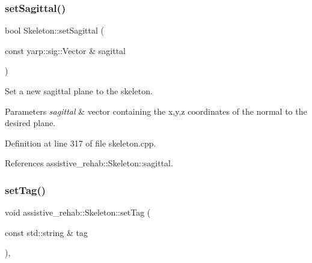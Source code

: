 \subsubsection{\texorpdfstring{setSagittal()}{setSagittal()}}
{\footnotesize\ttfamily bool Skeleton\+::set\+Sagittal (\begin{DoxyParamCaption}\item[{const yarp\+::sig\+::\+Vector \&}]{sagittal }\end{DoxyParamCaption})\hspace{0.3cm}{\ttfamily [inherited]}}



Set a new sagittal plane to the skeleton. 


\begin{DoxyParams}{Parameters}
{\em sagittal} & vector containing the x,y,z coordinates of the normal to the desired plane. \\
\hline
\end{DoxyParams}


Definition at line 317 of file skeleton.\+cpp.


\begin{DoxyCode}{0}

\end{DoxyCode}


References assistive\+\_\+rehab\+::\+Skeleton\+::sagittal.

\mbox{\label{classassistive__rehab_1_1Skeleton_ae1c830e3d9a0ba692e5ae297caa52a82}} 
\subsubsection{\texorpdfstring{setTag()}{setTag()}}
{\footnotesize\ttfamily void assistive\+\_\+rehab\+::\+Skeleton\+::set\+Tag (\begin{DoxyParamCaption}\item[{const std\+::string \&}]{tag }\end{DoxyParamCaption})\hspace{0.3cm}{\ttfamily [inline]}, {\ttfamily [inherited]}}



